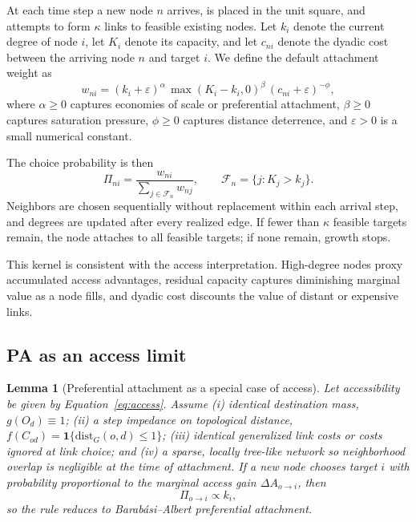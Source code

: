 \documentclass[11pt]{article}
\newtheorem{lemma}{Lemma}
\begin{document}
At each time step a new node $n$ arrives, is placed in the unit square, and attempts to form $\kappa$ links to feasible existing nodes. Let $k_i$ denote the current degree of node $i$, let $K_i$ denote its capacity, and let $c_{ni}$ denote the dyadic cost between the arriving node $n$ and target $i$. We define the default attachment weight as
\begin{equation}
w_{ni} = (k_i+\varepsilon)^{\alpha}\,\max(K_i-k_i,0)^{\beta}\,(c_{ni}+\varepsilon)^{-\phi},
\label{eq:kernel}
\end{equation}
where $\alpha \ge 0$ captures economies of scale or preferential attachment, $\beta \ge 0$ captures saturation pressure, $\phi \ge 0$ captures distance deterrence, and $\varepsilon > 0$ is a small numerical constant.

The choice probability is then
\begin{equation}
\Pi_{ni}=\frac{w_{ni}}{\sum_{j\in\mathcal{F}_n}w_{nj}},
\qquad
\mathcal{F}_n=\{j:K_j>k_j\}.
\label{eq:probability}
\end{equation}
Neighbors are chosen sequentially without replacement within each arrival step, and degrees are updated after every realized edge. If fewer than $\kappa$ feasible targets remain, the node attaches to all feasible targets; if none remain, growth stops.

This kernel is consistent with the access interpretation. High-degree nodes proxy accumulated access advantages, residual capacity captures diminishing marginal value as a node fills, and dyadic cost discounts the value of distant or expensive links.

\subsection{PA as an access limit}

\begin{lemma}[Preferential attachment as a special case of access]
Let accessibility be given by Equation~\ref{eq:access}. Assume (i) identical destination mass, $g(O_d)\equiv 1$; (ii) a step impedance on topological distance, $f(C_{od})=\mathbf{1}\{\mathrm{dist}_G(o,d)\le 1\}$; (iii) identical generalized link costs or costs ignored at link choice; and (iv) a sparse, locally tree-like network so neighborhood overlap is negligible at the time of attachment. If a new node chooses target $i$ with probability proportional to the marginal access gain $\Delta A_{o\to i}$, then
\[
\Pi_{o\to i}\propto k_i,
\]
so the rule reduces to Barab\'asi--Albert preferential attachment.
\end{lemma}
\end{document}
